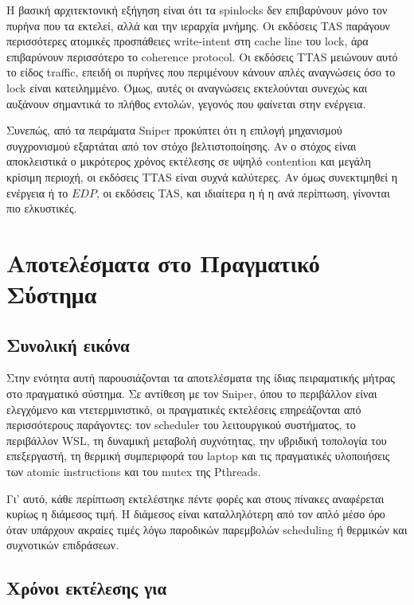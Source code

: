 \documentclass{article}
\newcommand{\code}[1]{\texttt{\detokenize{#1}}}
\begin{document}
Η βασική αρχιτεκτονική εξήγηση είναι ότι τα spinlocks δεν επιβαρύνουν μόνο τον πυρήνα που τα εκτελεί, αλλά και την ιεραρχία μνήμης. Οι εκδόσεις TAS παράγουν περισσότερες ατομικές προσπάθειες write-intent στη cache line του lock, άρα επιβαρύνουν περισσότερο το coherence protocol. Οι εκδόσεις TTAS μειώνουν αυτό το είδος traffic, επειδή οι πυρήνες που περιμένουν κάνουν απλές αναγνώσεις όσο το lock είναι κατειλημμένο. Όμως, αυτές οι αναγνώσεις εκτελούνται συνεχώς και αυξάνουν σημαντικά το πλήθος εντολών, γεγονός που φαίνεται στην ενέργεια.

Συνεπώς, από τα πειράματα Sniper προκύπτει ότι η επιλογή μηχανισμού συγχρονισμού εξαρτάται από τον στόχο βελτιστοποίησης. Αν ο στόχος είναι αποκλειστικά ο μικρότερος χρόνος εκτέλεσης σε υψηλό contention και μεγάλη κρίσιμη περιοχή, οι εκδόσεις TTAS είναι συχνά καλύτερες. Αν όμως συνεκτιμηθεί η ενέργεια ή το $EDP$, οι εκδόσεις TAS, και ιδιαίτερα η \code{TAS_TS} ή η \code{TAS_CAS} ανά περίπτωση, γίνονται πιο ελκυστικές.

\FloatBarrier

\section{Αποτελέσματα στο Πραγματικό Σύστημα}

\subsection{Συνολική εικόνα}

Στην ενότητα αυτή παρουσιάζονται τα αποτελέσματα της ίδιας πειραματικής μήτρας στο πραγματικό σύστημα. Σε αντίθεση με τον Sniper, όπου το περιβάλλον είναι ελεγχόμενο και ντετερμινιστικό, οι πραγματικές εκτελέσεις επηρεάζονται από περισσότερους παράγοντες: τον scheduler του λειτουργικού συστήματος, το περιβάλλον WSL, τη δυναμική μεταβολή συχνότητας, την υβριδική τοπολογία του επεξεργαστή, τη θερμική συμπεριφορά του laptop και τις πραγματικές υλοποιήσεις των atomic instructions και του mutex της Pthreads.

Γι' αυτό, κάθε περίπτωση εκτελέστηκε πέντε φορές και στους πίνακες αναφέρεται κυρίως η διάμεσος τιμή. Η διάμεσος είναι καταλληλότερη από τον απλό μέσο όρο όταν υπάρχουν ακραίες τιμές λόγω παροδικών παρεμβολών scheduling ή θερμικών και συχνοτικών επιδράσεων.

\subsection{Χρόνοι εκτέλεσης για \code{grain=1}}
\end{document}
